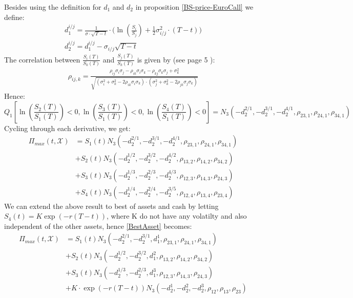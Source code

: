 Besides using the definition for $d_1$ and $d_2$ in proposition \ref{BS-price-EuroCall} we define:
\begin{align}
d^{i/j}_1 =\frac{1}{\sigma\cdot \sqrt{T-t}} \cdot \bigg( \ln(\frac{S_i}{S_j}) + \frac{1}{2} \sigma_{i/j}^2 \cdot (T-t) \bigg)\\
d^{i/j}_2=d^{i/j}_1-\sigma_{i/j} \sqrt{T-t}
\end{align}
The correlation between $\frac{S_i(T)}{S_k(T)}$ and $\frac{S_j(T)}{S_k(T)}$ is given by (see page 5 \parencite{Ouwehand2006}):
\begin{align}
\rho_{ij,k}= \frac{\rho_{ij}\sigma_i \sigma_j - \rho_{ik}\sigma_i \sigma_k - \rho_{kj}\sigma_k \sigma_j + \sigma_k^2}{\sqrt{(\sigma_i^2 + \sigma_k^2 - 2\rho_{ik}\sigma_i \sigma_k)\cdot(\sigma_j^2 + \sigma_k^2 - 2\rho_{jk}\sigma_j \sigma_k)}}
\end{align}
Hence:
$$Q_1[\ln(\frac{S_2(T)}{S_1(T)})<0, \ln(\frac{S_3(T)}{S_1(T)})<0, \ln(\frac{S_4(T)}{S_1(T)})<0]=N_3(-d_2^{2/1},-d_2^{3/1},-d_2^{4/1}, \rho_{23,1}, \rho_{24,1}, \rho_{34,1})$$
Cycling through each derivative, we get:
\begin{equation}\label{BestAsset}
\begin{split}
\Pi_{max}(t,\mathcal{X})&=S_1(t) N_3(-d_2^{2/1},-d_2^{3/1},-d_2^{4/1}, \rho_{23,1}, \rho_{24,1}, \rho_{34,1}) \\
&+S_2(t) N_3(-d_2^{1/2},-d_2^{3/2},-d_2^{4/2}, \rho_{13,2}, \rho_{14,2}, \rho_{34,2})\\
&+S_3(t) N_3(-d_2^{1/3},-d_2^{2/3},-d_2^{4/3}, \rho_{12,3}, \rho_{14,3}, \rho_{24,3}) \\
&+S_4(t) N_3(-d_2^{1/4},-d_2^{2/4},-d_2^{3/5}, \rho_{12,4}, \rho_{13,4}, \rho_{23,4})
\end{split}
\end{equation}
We can extend the above result to best of assets and cash by letting $S_4(t)=K\exp(-r(T-t))$, where K do not have any volatilty and also independent of the other assets, hence \eqref{BestAsset} becomes:
\begin{equation}\label{BestAssetOrCash}
\begin{split}
\Pi_{max}(t,\mathcal{X})&=S_1(t) N_3(-d_2^{2/1},-d_2^{3/1},d_1^{1}, \rho_{23,1}, \rho_{24,1}, \rho_{34,1}) \\
&+S_2(t) N_3(-d_2^{1/2},-d_2^{3/2},d_1^{2}, \rho_{13,2}, \rho_{14,2}, \rho_{34,2})\\
&+S_3(t) N_3(-d_2^{1/3},-d_2^{2/3},d_1^{3}, \rho_{12,3}, \rho_{14,3}, \rho_{24,3}) \\
&+K\cdot \exp(-r(T-t)) N_3(-d_2^1,-d_2^2,-d_2^3, \rho_{12}, \rho_{13}, \rho_{23})
\end{split}
\end{equation}

